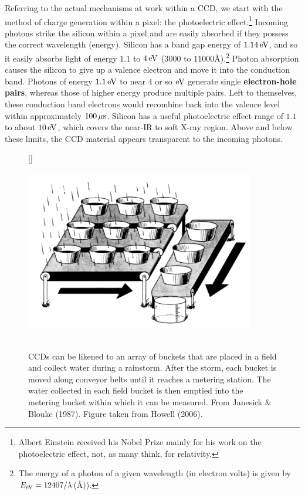 \documentclass[a4paper,10pt]{article}
\begin{document}
{\noindent}Referring to the actual mechanisms at work within a CCD, we start with the method of charge generation within a pixel: the photoelectric effect.\footnote{Albert Einstein received his Nobel Prize mainly for his work on the photoelectric effect, not, as many think, for relativity.} Incoming photons strike the silicon within a pixel and are easily absorbed if they possess the correct wavelength (energy). Silicon has a band gap energy of $1.14\,{\rm eV}$, and so it easily absorbs light of energy $1.1$ to $4\,{\rm eV}$ ($3000$ to $11000$\AA).\footnote{The energy of a photon of a given wavelength (in electron volts) is given by $E_{\rm eV}=12407/\lambda$(\AA)).} Photon absorption causes the silicon to give up a valence electron and move it into the conduction band. Photons of energy $1.1\,{\rm eV}$ to near $4$ or so ${\rm eV}$ generate single \textbf{electron-hole pairs}, whereas those of higher energy produce multiple pairs. Left to themselves, these conduction band electrons would recombine back into the valence level within approximately $100\,\mu{\rm s}$. Silicon has a useful photoelectric effect range of $1.1$ to about $10\,{\rm eV}$, which covers the near-IR to soft X-ray region. Above and below these limits, the CCD material appears transparent to the incoming photons.

\begin{figure}[t]
    [\FBwidth]
    {\caption{\footnotesize{\\CCDs can be likened to an array of buckets that are placed in a field and collect water during a rainstorm. After the storm, each bucket is moved along conveyor belts until it reaches a metering station. The water collected in each field bucket is then emptied into the metering bucket within which it can be measured. From Janesick \& Blouke (1987). Figure taken from Howell (2006).}}
    \label{fig:ccdoperation}}
    {\includegraphics[width=10cm]{figures/CCDoperation.png}}
\end{figure}
\end{document}
